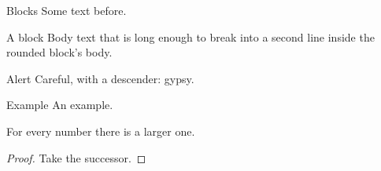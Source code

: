 \documentclass{beamer}
\begin{document}
\begin{frame}{Blocks}
Some text before.
\begin{block}{A block}
Body text that is long enough to break into a second line inside the rounded block's body.
\end{block}
\begin{alertblock}{Alert}
Careful, with a descender: gypsy.
\end{alertblock}
\begin{exampleblock}{Example}
An example.
\end{exampleblock}
\end{frame}
\begin{frame}
\begin{theorem}[Main]
For every number there is a larger one.
\end{theorem}
\begin{proof}
Take the successor.
\end{proof}
\end{frame}
\end{document}
